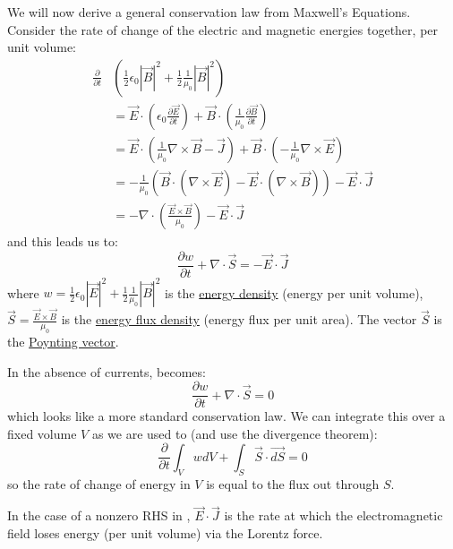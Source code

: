 \documentclass[../Main.tex]{subfiles}
\begin{document}
We will now derive a general conservation law from Maxwell's Equations. Consider the rate of change of the electric and magnetic energies together, per unit volume:
\begin{align*}
    \frac{\partial}{\partial t}&\left(\frac{1}{2} \epsilon_0 |\vec{B}|^2 + \frac{1}{2} \frac{1}{\mu_0} |\vec{B}|^2\right) \\
    &= \vec{E} \cdot \left(\epsilon_0 \frac{\partial \vec{E}}{\partial t}\right) + \vec{B} \cdot \left(\frac{1}{\mu_0} \frac{\partial \vec{B}}{\partial t}\right) \\
    &= \vec{E} \cdot \left(\frac{1}{\mu_0} \nabla \times \vec{B} - \vec{J}\right) + \vec{B} \cdot \left(-\frac{1}{\mu_0} \nabla \times \vec{E}\right) \\
    &= -\frac{1}{\mu_0} \left(\vec{B} \cdot (\nabla \times \vec{E}) - \vec{E} \cdot (\nabla \times \vec{B})\right) - \vec{E} \cdot \vec{J} \\
    &= - \nabla \cdot \left(\frac{\vec{E} \times \vec{B}}{\mu_0}\right) - \vec{E} \cdot \vec{J}
\end{align*}
and this leads us to:
\begin{equation}
    \frac{\partial w}{\partial t} + \nabla \cdot \vec{S} = -\vec{E} \cdot \vec{J}
    \label{eqnConserveEnergy}
\end{equation}
where $w = \frac12 \epsilon_0 |\vec{E}|^2 + \frac12 \frac{1}{\mu_0} |\vec{B}|^2$ is the \underline{energy density} (energy per unit volume), $\vec{S} = \frac{\vec{E} \times \vec{B}}{\mu_0}$ is the \underline{energy flux density} (energy flux per unit area). The vector $\vec{S}$ is the \underline{Poynting vector}.

In the absence of currents,  becomes:
\begin{equation*}
    \frac{\partial w}{\partial t} + \nabla \cdot \vec{S} = 0
\end{equation*}
which looks like a more standard conservation law. We can integrate this over a fixed volume $V$ as we are used to (and use the divergence theorem):
\begin{equation*}
    \frac{\partial}{\partial t} \int_V w dV + \int_S \vec{S} \cdot \vec{dS} = 0
\end{equation*}
so the rate of change of energy in $V$ is equal to the flux out through $S$.

In the case of a nonzero RHS in , $\vec{E} \cdot \vec{J}$ is the rate at which the electromagnetic field loses energy (per unit volume) via the Lorentz force.
\end{document}
